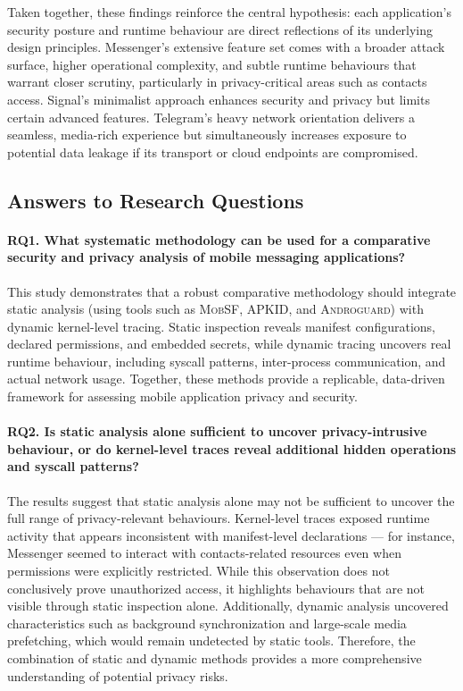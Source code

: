 \documentclass[a4paper,12pt]{report}
\begin{document}
Taken together, these findings reinforce the central hypothesis: each application's security posture and runtime behaviour are direct reflections of its underlying design principles. Messenger's extensive feature set comes with a broader attack surface, higher operational complexity, and subtle runtime behaviours that warrant closer scrutiny, particularly in privacy-critical areas such as contacts access. Signal's minimalist approach enhances security and privacy but limits certain advanced features. Telegram's heavy network orientation delivers a seamless, media-rich experience but simultaneously increases exposure to potential data leakage if its transport or cloud endpoints are compromised.

\subsection{Answers to Research Questions}

\paragraph{\textbf{RQ1.} What systematic methodology can be used for a comparative security and privacy analysis of mobile messaging applications?}

This study demonstrates that a robust comparative methodology should integrate static analysis (using tools such as \textsc{MobSF}, \textsc{APKID}, and \textsc{Androguard}) with dynamic kernel-level tracing. Static inspection reveals manifest configurations, declared permissions, and embedded secrets, while dynamic tracing uncovers real runtime behaviour, including syscall patterns, inter-process communication, and actual network usage. Together, these methods provide a replicable, data-driven framework for assessing mobile application privacy and security.

\paragraph{\textbf{RQ2.} Is static analysis alone sufficient to uncover privacy-intrusive behaviour, or do kernel-level traces reveal additional hidden operations and syscall patterns?}

The results suggest that static analysis alone may not be sufficient to uncover the full range of privacy-relevant behaviours. Kernel-level traces exposed runtime activity that appears inconsistent with manifest-level declarations — for instance, Messenger seemed to interact with contacts-related resources even when permissions were explicitly restricted. While this observation does not conclusively prove unauthorized access, it highlights behaviours that are not visible through static inspection alone. Additionally, dynamic analysis uncovered characteristics such as background synchronization and large-scale media prefetching, which would remain undetected by static tools. Therefore, the combination of static and dynamic methods provides a more comprehensive understanding of potential privacy risks.
\end{document}
